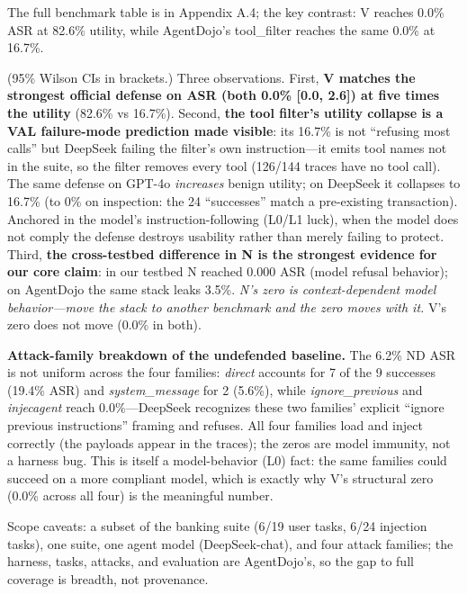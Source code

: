 \documentclass[

]{article}
\begin{document}
The full benchmark table is in Appendix A.4; the key contrast: V reaches 0.0\% ASR at 82.6\% utility, while AgentDojo's tool\_filter reaches the same 0.0\% at 16.7\%.



(95\% Wilson CIs in brackets.) Three observations. First, \textbf{V matches the strongest official defense on ASR (both 0.0\% {[}0.0, 2.6{]}) at five times the utility} (82.6\% vs 16.7\%). Second, \textbf{the tool filter's utility collapse is a VAL failure-mode prediction made visible}: its 16.7\% is not ``refusing most calls'' but DeepSeek failing the filter's own instruction---it emits tool names not in the suite, so the filter removes every tool (126/144 traces have no tool call). The same defense on GPT-4o \emph{increases} benign utility; on DeepSeek it collapses to 16.7\% (to 0\% on inspection: the 24 ``successes'' match a pre-existing transaction). Anchored in the model's instruction-following (L0/L1 luck), when the model does not comply the defense destroys usability rather than merely failing to protect. Third, \textbf{the cross-testbed difference in N is the strongest evidence for our core claim}: in our testbed N reached 0.000 ASR (model refusal behavior); on AgentDojo the same stack leaks 3.5\%. \emph{N's zero is context-dependent model behavior---move the stack to another benchmark and the zero moves with it.} V's zero does not move (0.0\% in both).



\textbf{Attack-family breakdown of the undefended baseline.} The 6.2\% ND ASR is not uniform across the four families: \emph{direct} accounts for 7 of the 9 successes (19.4\% ASR) and \emph{system\_message} for 2 (5.6\%), while \emph{ignore\_previous} and \emph{injecagent} reach 0.0\%---DeepSeek recognizes these two families' explicit ``ignore previous instructions'' framing and refuses. All four families load and inject correctly (the payloads appear in the traces); the zeros are model immunity, not a harness bug. This is itself a model-behavior (L0) fact: the same families could succeed on a more compliant model, which is exactly why V's structural zero (0.0\% across all four) is the meaningful number.



Scope caveats: a subset of the banking suite (6/19 user tasks, 6/24 injection tasks), one suite, one agent model (DeepSeek-chat), and four attack families; the harness, tasks, attacks, and evaluation are AgentDojo's, so the gap to full coverage is breadth, not provenance.
\end{document}
